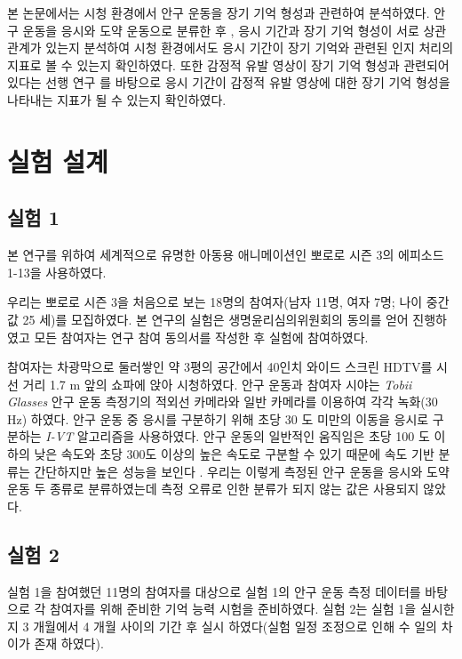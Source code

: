 \documentclass{kcc}
\begin{document}
본 논문에서는 시청 환경에서 안구 운동을 장기 기억 형성과 관련하여 분석하였다. 안구 운동을 응시와 도약 운동으로 분류한 후 \cite{Findlay1999,Feng2003,Feng2006}, 응시 기간과 장기 기억 형성이 서로 상관 관계가 있는지 분석하여 시청 환경에서도 응시 기간이 장기 기억와 관련된 인지 처리의 지표로 볼 수 있는지 확인하였다. 또한 감정적 유발 영상이 장기 기억 형성과 관련되어 있다는 선행 연구 \cite{Cahill1996amyg,Cahill1998baso}를 바탕으로 응시 기간이 감정적 유발 영상에 대한 장기 기억 형성을 나타내는 지표가 될 수 있는지 확인하였다. 

\section{실험 설계}

\subsection{실험 1}
본 연구를 위하여 세계적으로 유명한 아동용 애니메이션인 뽀로로 시즌 3의 에피소드 1-13을 사용하였다. 

우리는 뽀로로 시즌 3을 처음으로 보는 18명의 참여자(남자 11명, 여자 7명; 나이 중간 값 25 세)를 모집하였다. 본 연구의 실험은 생명윤리심의위원회의 동의를 얻어 진행하였고 모든 참여자는 연구 참여 동의서를 작성한 후 실험에 참여하였다.

참여자는 차광막으로 둘러쌓인 약 3평의 공간에서 40인치 와이드 스크린 HDTV를 시선 거리 1.7 m 앞의 쇼파에 앉아 시청하였다. 안구 운동과 참여자 시야는 \textit{Tobii Glasses} 안구 운동 측정기의 적외선 카메라와 일반 카메라를 이용하여 각각 녹화(30 Hz) 하였다. 안구 운동 중 응시를 구분하기 위해 초당 30 도 미만의 이동을 응시로 구분하는 \textit{I-VT} 알고리즘을 사용하였다. 안구 운동의 일반적인 움직임은 초당 100 도 이하의 낮은 속도와 초당 300도 이상의 높은 속도로 구분할 수 있기 때문에 속도 기반 분류는 간단하지만 높은 성능을 보인다 \cite{Salvucci2000}. 우리는 이렇게 측정된 안구 운동을 응시와 도약 운동 두 종류로 분류하였는데 측정 오류로 인한 분류가 되지 않는 값은 사용되지 않았다. 


\subsection{실험 2}
\label{subsec:experiment2}
실험 1을 참여했던 11명의 참여자를 대상으로 실험 1의 안구 운동 측정 데이터를 바탕으로 각 참여자를 위해 준비한 기억 능력 시험을 준비하였다. 실험 2는 실험 1을 실시한 지 3 개월에서 4 개월 사이의 기간 후 실시 하였다(실험 일정 조정으로 인해 수 일의 차이가 존재 하였다).
\end{document}
